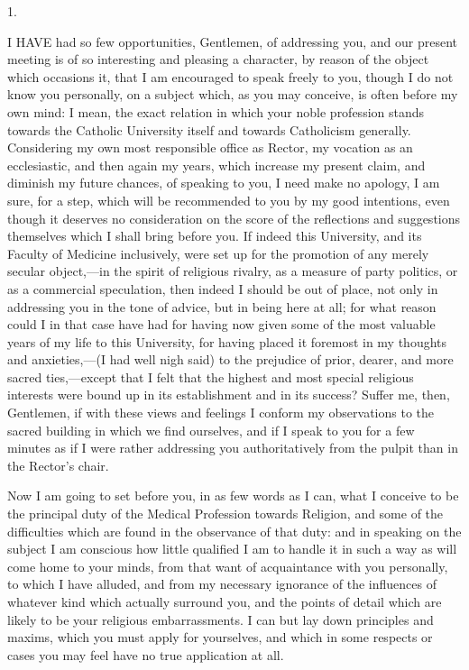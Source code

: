 

1.

I HAVE had so few opportunities, Gentlemen, of addressing
you, and our present meeting is of so interesting and pleasing a
character, by reason of the object which occasions it, that I am
encouraged to speak freely to you, though I do not know you
personally, on a subject which, as you may conceive, is often before
my own mind: I mean, the exact relation in which your noble profession
stands towards the Catholic University itself and towards Catholicism
generally. Considering my own most responsible office as Rector, my
vocation as an ecclesiastic, and then again my years, which increase
my present claim, and diminish my future chances, of speaking to you,
I need make no apology, I am sure, for a step, which will be
recommended to you by my good intentions, even though it deserves no
consideration on the score of the reflections and suggestions
themselves which I shall bring before you. If indeed this University,
and its Faculty of Medicine inclusively, were set up for the promotion
of any merely secular object,—in the spirit of religious rivalry, as
a measure of party politics, or as a commercial speculation, then
indeed I should be out of place, not only in addressing you in
the tone of advice, but in being here at all; for what reason could I
in that case have had for having now given some of the most valuable
years of my life to this University, for having placed it foremost in
my thoughts and anxieties,—(I had well nigh said) to the prejudice
of prior, dearer, and more sacred ties,—except that I felt that the
highest and most special religious interests were bound up in its
establishment and in its success? Suffer me, then, Gentlemen, if with
these views and feelings I conform my observations to the sacred
building in which we find ourselves, and if I speak to you for a few
minutes as if I were rather addressing you authoritatively from the
pulpit than in the Rector's chair.

Now I am going to set before you, in as few words as I can, what I
conceive to be the principal duty of the Medical Profession towards
Religion, and some of the difficulties which are found in the
observance of that duty: and in speaking on the subject I am conscious
how little qualified I am to handle it in such a way as will come home
to your minds, from that want of acquaintance with you personally, to
which I have alluded, and from my necessary ignorance of the
influences of whatever kind which actually surround you, and the
points of detail which are likely to be your religious embarrassments.
I can but lay down principles and maxims, which you must apply for
yourselves, and which in some respects or cases you may feel have no
true application at all.

